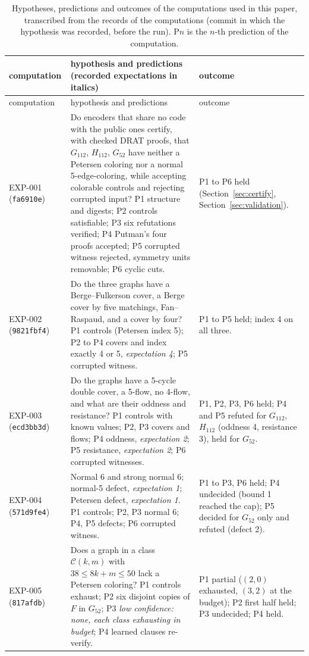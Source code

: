 \documentclass[11pt]{article}
\theoremstyle{definition}
\theoremstyle{remark}
\newcommand{\Gmain}{G_{112}}
\newcommand{\Gsym}{H_{112}}
\newcommand{\Gfty}{G_{52}}
\begin{document}
{\footnotesize\setlength{\tabcolsep}{3pt}
\begin{longtable}{>{\raggedright\arraybackslash}p{2.0cm}>{\raggedright\arraybackslash}p{6.2cm}>{\raggedright\arraybackslash}p{6.0cm}}
\caption{Hypotheses, predictions and outcomes of the computations used in this paper, transcribed
from the records of the computations (commit in which the hypothesis was recorded, before the run).
P$n$ is the $n$-th prediction of the computation.}\label{tab:hypotheses}\\
\toprule
computation & hypothesis and predictions (recorded expectations in italics) & outcome\\
\midrule
\endfirsthead
\toprule
computation & hypothesis and predictions & outcome\\
\midrule
\endhead
\bottomrule
\endfoot
EXP-001 (\texttt{fa6910e}) & Do encoders that share no code with the public ones certify, with checked DRAT proofs, that $\Gmain$, $\Gsym$, $\Gfty$ have neither a Petersen coloring nor a normal 5-edge-coloring, while accepting colorable controls and rejecting corrupted input? P1 structure and digests; P2 controls satisfiable; P3 six refutations verified; P4 Putman's four proofs accepted; P5 corrupted witness rejected, symmetry units removable; P6 cyclic cuts. & P1 to P6 held (Section~\ref{sec:certify}, Section~\ref{sec:validation}).\\
EXP-002 (\texttt{9821fbf4}) & Do the three graphs have a Berge--Fulkerson cover, a Berge cover by five matchings, Fan--Raspaud, and a cover by four? P1 controls (Petersen index 5); P2 to P4 covers and index exactly 4 or 5, \emph{expectation 4}; P5 corrupted witness. & P1 to P5 held; index 4 on all three.\\
EXP-003 (\texttt{ecd3bb3d}) & Do the graphs have a 5-cycle double cover, a 5-flow, no 4-flow, and what are their oddness and resistance? P1 controls with known values; P2, P3 covers and flows; P4 oddness, \emph{expectation 2}; P5 resistance, \emph{expectation 2}; P6 corrupted witnesses. & P1, P2, P3, P6 held; P4 and P5 refuted for $\Gmain$, $\Gsym$ (oddness 4, resistance 3), held for $\Gfty$.\\
EXP-004 (\texttt{571d9fe4}) & Normal 6 and strong normal 6; normal-5 defect, \emph{expectation 1}; Petersen defect, \emph{expectation 1}. P1 controls; P2, P3 normal 6; P4, P5 defects; P6 corrupted witness. & P1 to P3, P6 held; P4 undecided (bound 1 reached the cap); P5 decided for $\Gfty$ only and refuted (defect 2).\\
EXP-005 (\texttt{817afdb}) & Does a graph in a class $\mathcal C(k,m)$ with $38 \le 8k+m \le 50$ lack a Petersen coloring? P1 controls exhaust; P2 six disjoint copies of $F$ in $\Gfty$; P3 \emph{low confidence: none, each class exhausting in budget}; P4 learned clauses re-verify. & P1 partial ($(2,0)$ exhausted, $(3,2)$ at the budget); P2 first half held; P3 undecided; P4 held.\\

\end{longtable}}
\end{document}
